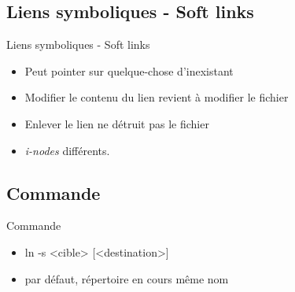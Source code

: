 \begin{frame}{\sectitle}

\def\subsectitle{Liens symboliques - Soft links}
\subsection{\subsectitle}
\begin{block}{\subsectitle}
    \begin{itemize}
        \item Peut pointer sur quelque-chose d'inexistant
        \item Modifier le contenu du lien revient à modifier le fichier
        \item Enlever le lien ne détruit pas le fichier
        \item \textit{i-nodes} différents.
    \end{itemize}
\end{block}

\def\subsectitle{Commande}
\subsection{\subsectitle}
\begin{exampleblock}{\subsectitle}
    \begin{itemize}
        \item ln -s <cible> [<destination>]
        \item par défaut, répertoire en cours même nom
    \end{itemize}
\end{exampleblock}
\end{frame}



